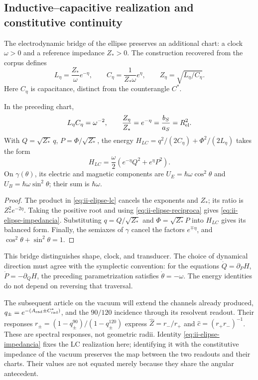 \subsection{Inductive--capacitive realization and constitutive continuity}
\label{sec:ii-elipse-lc}

The electrodynamic bridge of the ellipse preserves an additional chart:
a clock \(\omega>0\) and a reference impedance \(Z_*>0\).
The construction recovered from the corpus defines
\begin{equation}
 L_\eta=\frac{Z_*}{\omega}e^{-\eta},\qquad
 C_\eta=\frac{1}{Z_*\omega}e^\eta,
 \qquad Z_\eta=\sqrt{L_\eta/C_\eta}.
 \label{eq:ii-elipse-lc}
\end{equation}
Here \(C_\eta\) is capacitance, distinct from the counterangle \(C^*\).
\begin{proposition}
\label{prop:ii-elipse-lc}
In the preceding chart,
\begin{equation}
 L_\eta C_\eta=\omega^{-2},\qquad
 \frac{Z_\eta}{Z_*}=e^{-\eta}
 =\frac{b_S}{a_S}=R_{\rm el}^{2}.
 \label{eq:ii-elipse-impedancia}
\end{equation}
With \(Q=\sqrt{Z_*}\,q\), \(P=\Phi/\sqrt{Z_*}\), the energy
\(H_{LC}=q^2/(2C_\eta)+\Phi^2/(2L_\eta)\) takes the form
\[
 H_{LC}=\frac\omega2(e^{-\eta}Q^2+e^\eta P^2).
\]
On \(\gamma(\theta)\), its electric and magnetic components are
\(U_E=\hbar\omega\cos^2\theta\) and
\(U_B=\hbar\omega\sin^2\theta\); their sum is \(\hbar\omega\).
\end{proposition}
\begin{proof}
The product in \eqref{eq:ii-elipse-lc} cancels the exponents and
\(Z_*\); its ratio is \(Z_*^2e^{-2\eta}\). Taking the positive
root and using \eqref{eq:ii-elipse-reciproca} gives
\eqref{eq:ii-elipse-impedancia}. Substituting \(q=Q/\sqrt{Z_*}\)
and \(\Phi=\sqrt{Z_*}P\) into \(H_{LC}\) gives its balanced form.
Finally, the semiaxes of \(\gamma\) cancel the factors
\(e^{\mp\eta}\), and \(\cos^2\theta+\sin^2\theta=1\).
\end{proof}

This bridge distinguishes shape, clock, and transducer. The choice
of dynamical direction must agree with the symplectic convention: for
the equations \(\dot Q=\partial_PH\),
\(\dot P=-\partial_QH\), the preceding parametrization satisfies
\(\dot\theta=-\omega\). The energy identities do not depend
on reversing that traversal.

The subsequent article on the vacuum will extend the channels already produced,
\(q_\pm=e^{-(A_{\rm rad}\pm C^*_{\rm rad})}\), and the
\(90/120\) incidence through its resolvent readout. Their responses
\(r_\pm=(1-q_\pm^{90})/(1-q_\pm^{120})\) express
\(\widehat Z=r_-/r_+\) and \(\widehat c=(r_+r_-)^{-1}\).
These are spectral responses, not geometric radii. Identity
\eqref{eq:ii-elipse-impedancia} fixes the LC realization here;
identifying it with the constitutive impedance of the vacuum preserves the map
between the two readouts and their charts. Their values are not equated merely
because they share the angular antecedent.
